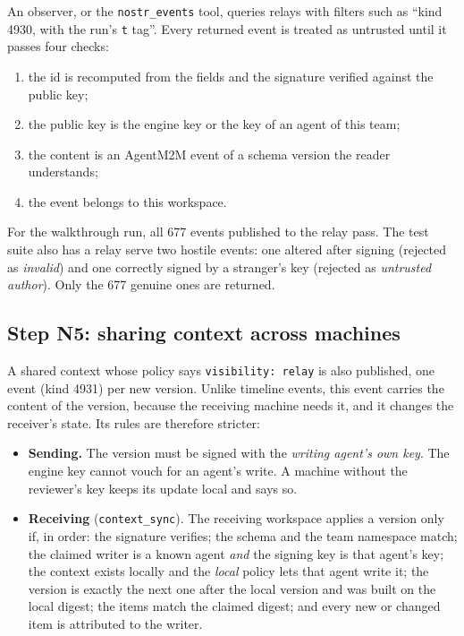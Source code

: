 \documentclass[10pt,a4paper]{article}
\newcommand{\code}[1]{\texttt{#1}}
\theoremstyle{definition}
\begin{document}
An observer, or the \code{nostr\_events} tool, queries relays with filters
such as ``kind 4930, with the run's \code{t} tag''. Every returned event is
treated as untrusted until it passes four checks:
\begin{enumerate}[nosep]
\item the id is recomputed from the fields and the signature verified against
the public key;
\item the public key is the engine key or the key of an agent of this team;
\item the content is an AgentM2M event of a schema version the reader
understands;
\item the event belongs to this workspace.
\end{enumerate}
\noindent For the walkthrough run, all 677 events published to the relay
pass. The test suite also has a relay serve two hostile events: one altered
after signing (rejected as \emph{invalid}) and one correctly signed by a
stranger's key (rejected as \emph{untrusted author}). Only the 677 genuine
ones are returned.

\subsection{Step N5: sharing context across machines}\label{sec:context-sync}

A shared context whose policy says \code{visibility: relay} is also
published, one event (kind 4931) per new version. Unlike timeline events, this
event carries the content of the version, because the receiving machine needs
it, and it changes the receiver's state. Its rules are therefore stricter:

\begin{itemize}[nosep]
\item \textbf{Sending.} The version must be signed with the \emph{writing
agent's own key}. The engine key cannot vouch for an agent's write. A
machine without the reviewer's key keeps its update local and says so.
\item \textbf{Receiving} (\code{context\_sync}). The receiving workspace
applies a version only if, in order: the signature verifies; the schema and
the team namespace match; the claimed writer is a known agent \emph{and} the
signing key is that agent's key; the context exists locally and the
\emph{local} policy lets that agent write it; the version is exactly the next
one after the local version and was built on the local digest; the items match
the claimed digest; and every new or changed item is attributed to the writer.
\end{itemize}
\end{document}
